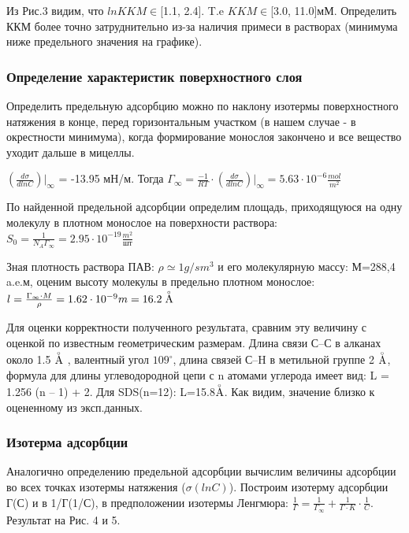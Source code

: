 \documentclass[a4paper, 12pt]{article}
\begin{document}
Из Рис.3 видим, что $lnKKM\in$[1.1, 2.4]. T.e $KKM \in$[3.0, 11.0]мМ. Определить ККМ более точно затруднительно из-за наличия примеси в растворах (минимума ниже предельного значения на графике).

\subsubsection{Определение характеристик поверхностного слоя}
Определить предельную адсорбцию можно по наклону изотермы поверхностного натяжения в конце, перед горизонтальным участком (в нашем случае - в окрестности минимума), когда формирование монослоя закончено и все вещество уходит дальше в мицеллы. 

$\left( \frac{d\sigma}{dlnC} \right) \bigg| _{\infty}$ = -13.95 мН/м.
Тогда $ \Gamma_{\infty} = \frac{-1}{RT} \cdot \left( \frac{d\sigma}{dlnC} \right) \bigg| _{\infty} = 5.63\cdot 10^{-6} \frac{mol}{m^2}$ 

По найденной предельной адсорбции определим площадь, приходящуюся на одну молекулу в плотном монослое на поверхности раствора:
$S_0 = \frac{1}{N_A \Gamma_{\infty}} = 2.95\cdot 10^{-19} \frac{m^2}{\text{шт}}$

Зная плотность раствора ПАВ: $\rho \simeq 1 g/sm^3$ и его молекулярную массу: М=288,4 a.e.м, оценим высоту молекулы в предельно плотном монослое: $l = \frac{\Gamma_{\infty}\cdot M}{\rho} = 1.62\cdot 10^{-9}m = 16.2 \buildrel _\circ \over {\mathrm{A}}$

Для оценки корректности полученного результата, сравним эту величину с оценкой по известным геометрическим размерам. Длина связи С–С в алканах около 1.5 $\buildrel _\circ \over {\mathrm{A}}$ , валентный угол $109^{\circ}$, длина связей С–H в метильной группе 2 $\buildrel _\circ \over {\mathrm{A}}$, формула для длины углеводородной цепи с n атомами углерода имеет вид: L = 1.256 (n – 1) + 2.
Для SDS(n=12): L=15.8$\buildrel _\circ \over {\mathrm{A}}$. Как видим, значение близко к оцененному из эксп.данных.

\subsubsection{Изотерма адсорбции}
Аналогично определению предельной адсорбции вычислим величины адсорбции во всех точках изотермы натяжения ($\sigma(lnC)$). Построим изотерму адсорбции Г(С) и в 1/Г(1/С), в предположении изотермы Ленгмюра: $\frac{1}{\Gamma} = \frac{1}{\Gamma_{\infty}} + \frac{1}{\Gamma \cdot K}\cdot \frac{1}{C}$. Результат на Рис. 4 и 5. 
\end{document}
